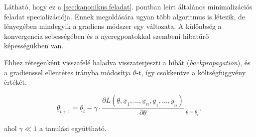 

%


Látható, hogy ez a \ref{sec:kanonikus.feladat}. pontban leírt általános minimalizációs feladat specializációja.
Ennek megoldására ugyan több algoritmus is létezik, de lényegében mindegyik a gradiens módszer egy változata.
A különbség a konvergencia sebességében és a nyeregpontokkal szembeni hibatűrő képességükben van.

Ehhez rétegenként visszafelé haladva visszaterjeszti a hibát (\textit{backpropagation}),
és a gradienssel ellentétes irányba módosítja $ \underline{\theta} $-t, így csökkentve a költségfüggvény értékét.

\[ 
 \underline{\theta}_{t+1} = \underline{\theta}_t - \gamma \cdot \frac{\partial L(\underline{\theta}, \underline{x}_1, \dots, \underline{x}_n, \underline{y}_1, \dots, \underline{y}_n)}{\partial \underline{\theta}}\bigg\rvert_{\underline{\theta}=\underline{\theta}_t}, 
 \]
 

\noindent
ahol $ \gamma \ll 1 $ a tanulási együttható. 



